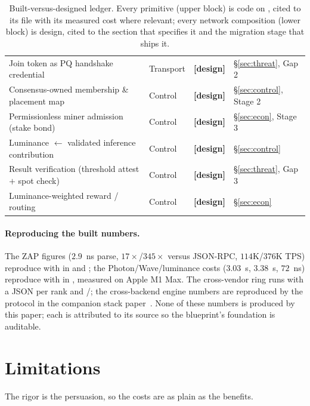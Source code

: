 \documentclass[11pt]{article}
\newcommand{\design}{\textcolor{cmt}{\small\textbf{[design]}}}
\begin{document}
\begin{table}[t]
\begin{tabular}{@{}p{4.9cm}p{1.5cm}p{1.5cm}p{5.0cm}@{}}
Join token as PQ handshake credential & Transport & \design{} & \S\ref{sec:threat}, Gap 2 \\
Consensus-owned membership \& placement map & Control & \design{} & \S\ref{sec:control}, Stage 2 \\
Permissionless miner admission (stake bond) & Control & \design{} & \S\ref{sec:econ}, Stage 3 \\
Luminance $\gets$ validated inference contribution & Control & \design{} & \S\ref{sec:control} \\
Result verification (threshold attest $+$ spot check) & Control & \design{} & \S\ref{sec:threat}, Gap 3 \\
Luminance-weighted reward / routing & Control & \design{} & \S\ref{sec:econ} \\
\bottomrule
\end{tabular}
\caption{Built-versus-designed ledger. Every primitive (upper block) is code on ,
cited to its file with its measured cost where relevant; every network composition (lower block)
is design, cited to the section that specifies it and the migration stage that ships it.}
\label{tab:status}
\end{table}

\paragraph{Reproducing the built numbers.} The ZAP figures ($2.9$~ns parse, $17\times$/$345\times$
versus JSON-RPC, $114$K/$376$K TPS) reproduce with  in
 and ; the Photon/Wave/luminance costs ($3.03$~\textmu s,
$3.38$~\textmu s, $72$~ns) reproduce with  in
, measured on Apple M1 Max. The cross-vendor ring runs with a
 JSON per rank and /; the cross-backend
engine numbers are reproduced by the protocol in the companion stack paper~\cite{infstack}. None
of these numbers is produced by this paper; each is attributed to its source so the blueprint's
foundation is auditable.

\section{Limitations}
\label{sec:limits}

The rigor is the persuasion, so the costs are as plain as the benefits.
\end{document}
